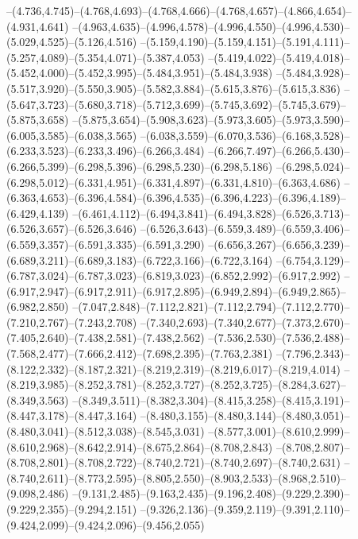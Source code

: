   --(4.736,4.745)--(4.768,4.693)--(4.768,4.666)--(4.768,4.657)--(4.866,4.654)--(4.931,4.641)%
  --(4.963,4.635)--(4.996,4.578)--(4.996,4.550)--(4.996,4.530)--(5.029,4.525)--(5.126,4.516)%
  --(5.159,4.190)--(5.159,4.151)--(5.191,4.111)--(5.257,4.089)--(5.354,4.071)--(5.387,4.053)%
  --(5.419,4.022)--(5.419,4.018)--(5.452,4.000)--(5.452,3.995)--(5.484,3.951)--(5.484,3.938)%
  --(5.484,3.928)--(5.517,3.920)--(5.550,3.905)--(5.582,3.884)--(5.615,3.876)--(5.615,3.836)%
  --(5.647,3.723)--(5.680,3.718)--(5.712,3.699)--(5.745,3.692)--(5.745,3.679)--(5.875,3.658)%
  --(5.875,3.654)--(5.908,3.623)--(5.973,3.605)--(5.973,3.590)--(6.005,3.585)--(6.038,3.565)%
  --(6.038,3.559)--(6.070,3.536)--(6.168,3.528)--(6.233,3.523)--(6.233,3.496)--(6.266,3.484)%
  --(6.266,7.497)--(6.266,5.430)--(6.266,5.399)--(6.298,5.396)--(6.298,5.230)--(6.298,5.186)%
  --(6.298,5.024)--(6.298,5.012)--(6.331,4.951)--(6.331,4.897)--(6.331,4.810)--(6.363,4.686)%
  --(6.363,4.653)--(6.396,4.584)--(6.396,4.535)--(6.396,4.223)--(6.396,4.189)--(6.429,4.139)%
  --(6.461,4.112)--(6.494,3.841)--(6.494,3.828)--(6.526,3.713)--(6.526,3.657)--(6.526,3.646)%
  --(6.526,3.643)--(6.559,3.489)--(6.559,3.406)--(6.559,3.357)--(6.591,3.335)--(6.591,3.290)%
  --(6.656,3.267)--(6.656,3.239)--(6.689,3.211)--(6.689,3.183)--(6.722,3.166)--(6.722,3.164)%
  --(6.754,3.129)--(6.787,3.024)--(6.787,3.023)--(6.819,3.023)--(6.852,2.992)--(6.917,2.992)%
  --(6.917,2.947)--(6.917,2.911)--(6.917,2.895)--(6.949,2.894)--(6.949,2.865)--(6.982,2.850)%
  --(7.047,2.848)--(7.112,2.821)--(7.112,2.794)--(7.112,2.770)--(7.210,2.767)--(7.243,2.708)%
  --(7.340,2.693)--(7.340,2.677)--(7.373,2.670)--(7.405,2.640)--(7.438,2.581)--(7.438,2.562)%
  --(7.536,2.530)--(7.536,2.488)--(7.568,2.477)--(7.666,2.412)--(7.698,2.395)--(7.763,2.381)%
  --(7.796,2.343)--(8.122,2.332)--(8.187,2.321)--(8.219,2.319)--(8.219,6.017)--(8.219,4.014)%
  --(8.219,3.985)--(8.252,3.781)--(8.252,3.727)--(8.252,3.725)--(8.284,3.627)--(8.349,3.563)%
  --(8.349,3.511)--(8.382,3.304)--(8.415,3.258)--(8.415,3.191)--(8.447,3.178)--(8.447,3.164)%
  --(8.480,3.155)--(8.480,3.144)--(8.480,3.051)--(8.480,3.041)--(8.512,3.038)--(8.545,3.031)%
  --(8.577,3.001)--(8.610,2.999)--(8.610,2.968)--(8.642,2.914)--(8.675,2.864)--(8.708,2.843)%
  --(8.708,2.807)--(8.708,2.801)--(8.708,2.722)--(8.740,2.721)--(8.740,2.697)--(8.740,2.631)%
  --(8.740,2.611)--(8.773,2.595)--(8.805,2.550)--(8.903,2.533)--(8.968,2.510)--(9.098,2.486)%
  --(9.131,2.485)--(9.163,2.435)--(9.196,2.408)--(9.229,2.390)--(9.229,2.355)--(9.294,2.151)%
  --(9.326,2.136)--(9.359,2.119)--(9.391,2.110)--(9.424,2.099)--(9.424,2.096)--(9.456,2.055)%
